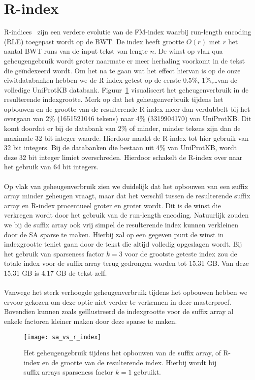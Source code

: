 \section{R-index}
R-indices~\cite{r_index1, r_index2} zijn een verdere evolutie van de FM-index waarbij run-length encoding (RLE) toegepast wordt op de BWT\@.
De index heeft grootte $O(r)$ met $r$ het aantal BWT runs van de input tekst van lengte $n$.
De winst op vlak qua geheugengebruik wordt groter naarmate er meer herhaling voorkomt in de tekst die geïndexeerd wordt.
Om het na te gaan wat het effect hiervan is op de onze eiwitdatabanken hebben we de R-index getest op de eerste 0.5\%, 1\%,\ldots van de volledige UniProtKB databank.
Figuur~\ref{fig:sa_vs_r_index} visualiseert het geheugenverbruik in de resulterende indexgrootte.
Merk op dat het geheugenverbruik tijdens het opbouwen en de grootte van de resulterende R-index meer dan verdubbelt bij het overgaan van 2\% (1651521046 tekens) naar 4\% (3319904170) van UniProtKB\@.
Dit komt doordat er bij de databank van 2\% of minder, minder tekens zijn dan de maximale 32 bit integer waarde.
Hierdoor maakt de R-index tot hier gebruik van 32 bit integers.
Bij de databanken die bestaan uit 4\% van UniProtKB, wordt deze 32 bit integer limiet overschreden.
Hierdoor schakelt de R-index over naar het gebruik van 64 bit integers.
\\ \\
Op vlak van geheugenverbruik zien we duidelijk dat het opbouwen van een suffix array minder geheugen vraagt, maar dat het verschil tussen de resulterende suffix array en R-index procentueel groter en groter wordt.
Dit is de winst die verkregen wordt door het gebruik van de run-length encoding.
Natuurlijk zouden we bij de suffix array ook vrij simpel de resulterende index kunnen verkleinen door de SA sparse te maken.
Hierbij zal op een gegeven punt de winst in indexgrootte teniet gaan door de tekst die altijd volledig opgeslagen wordt.
Bij het gebruik van sparseness factor $k = 3$ voor de grootste geteste index zou de totale index voor de suffix array terug gedrongen worden tot 15.31 GB\@.
Van deze 15.31 GB is 4.17 GB de tekst zelf.
\\ \\
Vanwege het sterk verhoogde geheugenverbruik tijdens het opbouwen hebben we ervoor gekozen om deze optie niet verder te verkennen in deze masterproef.
Bovendien kunnen zoals geïllustreerd de indexgrootte voor de suffix array al enkele factoren kleiner maken door deze sparse te maken.

\begin{figure}
    \centering
    \texttt{[image: sa\_vs\_r\_index]}
    \caption{Het geheugengebruik tijdens het opbouwen van de suffix array, of R-index en de grootte van de resulterende index. Hierbij wordt bij suffix arrays sparseness factor $k = 1$ gebruikt.}
    \label{fig:sa_vs_r_index}
\end{figure}

